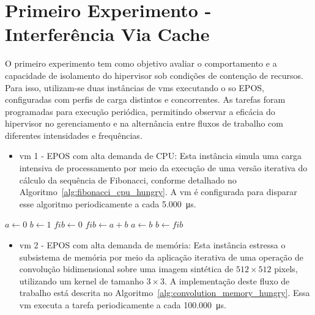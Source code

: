 \section{Primeiro Experimento - Interferência Via Cache}

O primeiro experimento tem como objetivo avaliar o comportamento e a capacidade de isolamento do hipervisor sob condições de contenção
de recursos. Para isso, utilizam-se duas instâncias de \glspl{vm} executando o \gls{so} EPOS, configuradas com perfis de carga distintos
e concorrentes. As tarefas foram programadas para execução periódica, permitindo observar a eficácia do hipervisor no gerenciamento
e na alternância entre fluxos de trabalho com diferentes intensidades e frequências.

\begin{itemize}
    \item \gls{vm} 1 - EPOS com alta demanda de CPU: Esta instância simula uma carga intensiva de processamento por meio da execução de
		uma versão iterativa do cálculo da sequência de Fibonacci, conforme detalhado no Algoritmo~\ref{alg:fibonacci_cpu_hungry}.
		A \gls{vm} é configurada para disparar esse algoritmo periodicamente a cada 5.000~\si{\micro\second}.
\end{itemize}

\begin{algorithm}[H]
\caption{Fibonacci Iterativo}
\label{alg:fibonacci_cpu_hungry}
\begin{algorithmic}[1]
    \State $a \gets 0$
    \State $b \gets 1$
    \State $fib \gets 0$
        \State $fib \gets a + b$
        \State $a \gets b$
        \State $b \gets fib$
    \EndFor
\EndProcedure
\end{algorithmic}
\end{algorithm}

\begin{itemize}
    \item \gls{vm} 2 - EPOS com alta demanda de memória: Esta instância estressa o subsistema de memória por meio da aplicação iterativa
		de uma operação de convolução bidimensional sobre uma imagem sintética de $512 \times 512$ pixels, utilizando um kernel de
		tamanho $3 \times 3$. A implementação deste fluxo de trabalho está descrita no Algoritmo~\ref{alg:convolution_memory_hungry}.
		Essa \gls{vm} executa a tarefa periodicamente a cada 100.000~\si{\micro\second}.
\end{itemize}

